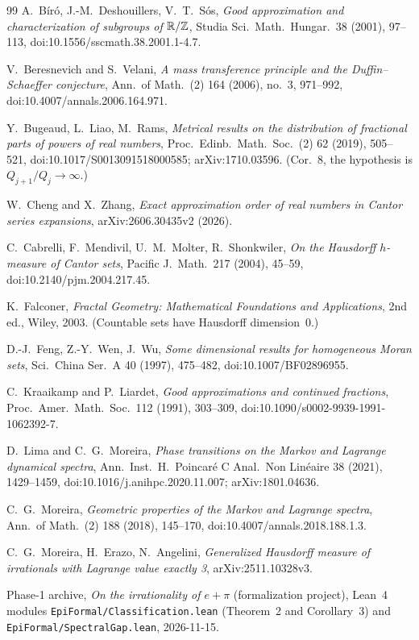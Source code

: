 \begin{thebibliography}{99}
 A.~B\'ir\'o, J.-M.~Deshouillers, V.~T.~S\'os, \emph{Good
approximation and characterization of subgroups of $\mathbb{R}/\mathbb{Z}$}, Studia Sci.\ Math.\ Hungar.\ 38 (2001), 97--113, doi:10.1556/sscmath.38.2001.1-4.7.

 V.~Beresnevich and S.~Velani, \emph{A mass transference principle
and the Duffin--Schaeffer conjecture}, Ann.\ of Math.\ (2) 164 (2006), no.~3, 971--992, doi:10.4007/annals.2006.164.971.

 Y.~Bugeaud, L.~Liao, M.~Rams, \emph{Metrical results on the
distribution of fractional parts of powers of real numbers}, Proc.\ Edinb.\ Math.\ Soc.\ (2) 62 (2019), 505--521, doi:10.1017/S0013091518000585; arXiv:1710.03596. (Cor.~8, the hypothesis is $Q_{j+1}/Q_j\to\infty$.)

 W.~Cheng and X.~Zhang, \emph{Exact approximation order of real numbers in
Cantor series expansions}, arXiv:2606.30435v2 (2026).

 C.~Cabrelli, F.~Mendivil, U.~M.~Molter, R.~Shonkwiler,
\emph{On the Hausdorff $h$-measure of Cantor sets}, Pacific J.\ Math.\ 217
(2004), 45--59, doi:10.2140/pjm.2004.217.45.

 K.~Falconer, \emph{Fractal Geometry: Mathematical
Foundations and Applications}, 2nd ed., Wiley, 2003. (Countable sets have
Hausdorff dimension~$0$.)

 D.-J.~Feng, Z.-Y.~Wen, J.~Wu, \emph{Some dimensional results
for homogeneous Moran sets}, Sci.\ China Ser.\ A 40 (1997), 475--482,
doi:10.1007/BF02896955.

 C.~Kraaikamp and P.~Liardet, \emph{Good approximations and
continued fractions}, Proc.\ Amer.\ Math.\ Soc.\ 112 (1991), 303--309, doi:10.1090/s0002-9939-1991-1062392-7.

 D.~Lima and C.~G.~Moreira, \emph{Phase transitions on
the Markov and Lagrange dynamical spectra}, Ann.\ Inst.\ H.~Poincar\'e
C Anal.\ Non Lin\'eaire 38 (2021), 1429--1459,
doi:10.1016/j.anihpc.2020.11.007; arXiv:1801.04636.

 C.~G.~Moreira, \emph{Geometric properties of the Markov and
Lagrange spectra}, Ann.\ of Math.\ (2) 188 (2018), 145--170,
doi:10.4007/annals.2018.188.1.3.

 C.~G.~Moreira, H.~Erazo, N.~Angelini,
\emph{Generalized Hausdorff measure of irrationals with Lagrange value exactly 3},
arXiv:2511.10328v3.

 Phase-1 archive, \emph{On the irrationality of $e+\pi$}
(formalization project), Lean~4 modules \texttt{EpiFormal/\allowbreak Classification.lean}
(Theorem~2 and Corollary~3) and \texttt{EpiFormal/\allowbreak Spectral\allowbreak Gap.lean}, 2026-11-15.
\end{thebibliography}
